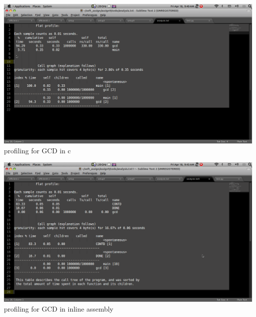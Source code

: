 \documentclass[a4paper,12pt]{report}
\begin{document}
\begin{center}
 \includegraphics[width=13 cm,height=12 cm]{./gcd.png}
profiling  for GCD in c  
\end{center}
\begin{center}
 \includegraphics[width=13 cm,height=12 cm]{./gcd1.png}
profiling  for GCD in inline assembly
\end{center}
\end{document}
